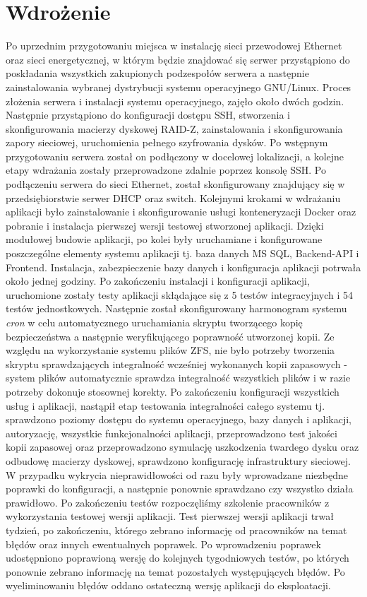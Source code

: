 \documentclass[12pt,a4paper]{article}
\begin{document}
	\section{Wdrożenie}
		\indent Po uprzednim przygotowaniu miejsca w instalację sieci przewodowej Ethernet oraz sieci energetycznej, w którym będzie znajdować się serwer  przystąpiono
		do poskładania wszystkich zakupionych podzespołów serwera a następnie zainstalowania wybranej dystrybucji systemu operacyjnego GNU/Linux. Proces złożenia serwera i instalacji
		systemu operacyjnego, zajęło około dwóch godzin. Następnie przystąpiono do konfiguracji dostępu SSH, stworzenia i skonfigurowania macierzy dyskowej RAID-Z,
		zainstalowania i skonfigurowania zapory sieciowej, uruchomienia pełnego szyfrowania dysków. Po wstępnym przygotowaniu serwera został on podłączony w docelowej lokalizacji,
		a kolejne etapy	wdrażania zostały przeprowadzone zdalnie poprzez konsolę SSH. Po podłączeniu serwera do sieci Ethernet, został skonfigurowany znajdujący się w przedsiębiorstwie
		serwer DHCP	oraz switch. Kolejnymi krokami w wdrażaniu aplikacji było zainstalowanie i skonfigurowanie usługi konteneryzacji Docker oraz pobranie i instalacja pierwszej wersji
		testowej stworzonej aplikacji. Dzięki modułowej budowie aplikacji, po kolei były uruchamiane i konfigurowane poszczególne elementy systemu aplikacji tj. baza danych MS SQL,
		Backend-API i Frontend.	Instalacja, zabezpieczenie bazy danych i konfiguracja aplikacji potrwała około jednej godziny. Po zakończeniu instalacji i konfiguracji aplikacji,
		uruchomione zostały testy aplikacji skłądające się z 5 testów integracyjnych i 54 testów jednostkowych. Następnie został skonfigurowany harmonogram systemu \emph{cron}
		w celu automatycznego uruchamiania skryptu tworzącego kopię bezpieczeństwa a następnie weryfikującego poprawność utworzonej kopii.
		Ze względu na wykorzystanie systemu plików ZFS, nie było potrzeby tworzenia skryptu sprawdzających integralność wcześniej wykonanych kopii zapasowych
		- system plików automatycznie sprawdza integralność wszystkich plików i w razie potrzeby dokonuje stosownej korekty. Po zakończeniu konfiguracji wszystkich usług i aplikacji,
		nastąpił etap testowania integralności całego systemu tj. sprawdzono poziomy dostępu do systemu operacyjnego, bazy danych i aplikacji, autoryzację, wszystkie funkcjonalności aplikacji,
		przeprowadzono test jakości kopii zapasowej oraz przeprowadzono symulację uszkodzenia twardego dysku oraz odbudowę macierzy dyskowej,
		sprawdzono konfigurację infrastruktury sieciowej. W przypadku wykrycia nieprawidłowości od razu były wprowadzane niezbędne poprawki do konfiguracji, a następnie ponownie
		sprawdzano czy wszystko działa prawidłowo. Po zakończeniu testów rozpoczęliśmy szkolenie pracowników z wykorzystania testowej wersji aplikacji. Test pierwszej wersji aplikacji
		trwał tydzień, po zakończeniu, którego zebrano informację od pracowników na temat błędów oraz innych ewentualnych poprawek. Po wprowadzeniu poprawek udostępniono poprawioną
		wersję do kolejnych tygodniowych testów, po których ponownie zebrano informację na temat pozostałych występujących błędów. Po wyeliminowaniu błędów oddano ostateczną wersję
		aplikacji do eksploatacji.
	\newpage
	
\end{document}
